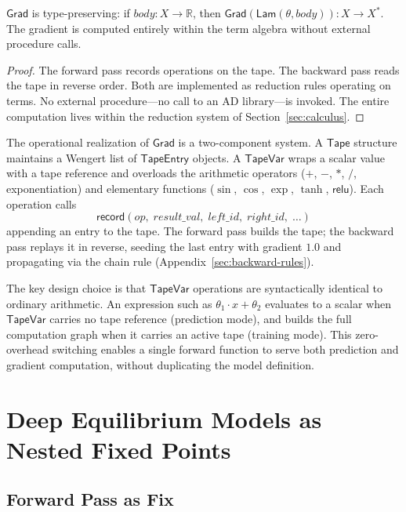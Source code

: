 \documentclass{lmcs}
\theoremstyle{plain}
\theoremstyle{definition}
\newcommand{\RR}{\mathbb{R}}
\begin{document}
\begin{thm}\label{thm:grad-term}
$\mathsf{Grad}$ is type-preserving: if $\mathit{body} : X \to \RR$, then
$\mathsf{Grad}(\mathsf{Lam}(\theta, \mathit{body})) : X \to X^*$. The
gradient is computed entirely within the term algebra without external
procedure calls.
\end{thm}

\begin{proof}
The forward pass records operations on the tape. The backward pass reads the
tape in reverse order. Both are implemented as reduction rules operating on
terms. No external procedure---no call to an AD library---is invoked. The
entire computation lives within the reduction system of
Section~\ref{sec:calculus}.
\end{proof}

The operational realization of $\mathsf{Grad}$ is a two-component system. A
$\mathsf{Tape}$ structure maintains a Wengert list of
$\mathsf{TapeEntry}$ objects. A $\mathsf{TapeVar}$ wraps a scalar value
with a tape reference and overloads the arithmetic operators ($+$, $-$, $*$,
$/$, exponentiation) and elementary functions ($\sin$, $\cos$, $\exp$,
$\tanh$, $\mathsf{relu}$). Each operation calls
\[
\mathsf{record}(op,\; result\_val,\; left\_id,\; right\_id,\; \dots)
\]
appending an entry to the tape. The forward pass builds the tape; the
backward pass replays it in reverse, seeding the last entry with gradient
$1.0$ and propagating via the chain rule (Appendix~\ref{sec:backward-rules}).

The key design choice is that $\mathsf{TapeVar}$ operations are syntactically
identical to ordinary arithmetic. An expression such as
$\theta_1 \cdot x + \theta_2$ evaluates to a scalar when $\mathsf{TapeVar}$
carries no tape reference (prediction mode), and builds the full computation
graph when it carries an active tape (training mode). This zero-overhead
switching enables a single forward function to serve both prediction and
gradient computation, without duplicating the model definition.

\section{Deep Equilibrium Models as Nested Fixed Points}\label{sec:deq}

\subsection{Forward Pass as Fix}
\end{document}
